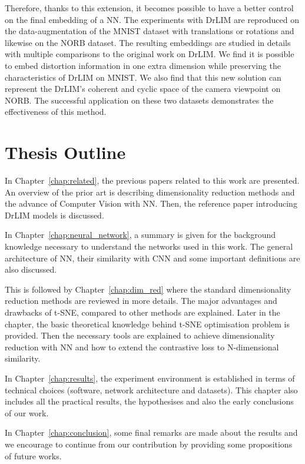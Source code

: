 \documentclass[a4paper,12pt]{report}
\begin{document}
Therefore, thanks to this extension, it becomes possible to have a better control on the final embedding of a NN.
The experiments with DrLIM are reproduced on the data-augmentation of the MNIST dataset\cite{lecun1998mnist} with translations or rotations and likewise on the NORB dataset\cite{lecun2004learning}.
The resulting embeddings are studied in details with multiple comparisons to the original work on DrLIM.
We find it is possible to embed distortion information in one extra dimension while preserving the characteristics of DrLIM on MNIST.
We also find that this new solution can represent the DrLIM's coherent and cyclic space of the camera viewpoint on NORB.
The successful application on these two datasets demonstrates the effectiveness of this method.

\section{Thesis Outline}
In Chapter~\ref{chap:related}, the previous papers related to this work are presented.
An overview of the prior art is describing dimensionality reduction methods and the advance of Computer Vision with NN.
Then, the reference paper introducing DrLIM models is discussed.

In Chapter~\ref{chap:neural_network}, a summary is given for the background knowledge necessary to understand the networks used in this work.
The general architecture of NN, their similarity with CNN and some important definitions are also discussed.

This is followed by Chapter~\ref{chap:dim_red} where the standard dimensionality reduction methods are reviewed in more details.
The major advantages and drawbacks of t-SNE, compared to other methods are explained.
Later in the chapter, the basic theoretical knowledge behind t-SNE optimisation problem is provided.
Then the necessary tools are explained to achieve dimensionality reduction with NN and how to extend the contrastive loss to N-dimensional similarity.

In Chapter~\ref{chap:results}, the experiment environment is established in terms of technical choices (software, network architecture and datasets).
This chapter also includes all the practical results, the hypothesises and also the early conclusions of our work.

In Chapter~\ref{chap:conclusion}, some final remarks are made about the results and we encourage to continue from our contribution by providing some propositions of future works.
\end{document}
